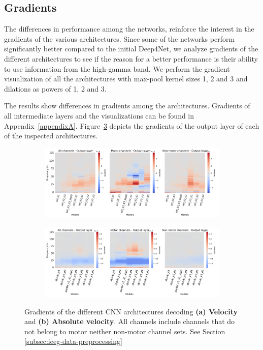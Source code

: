 \subsection{Gradients}\label{subsec:gradients}
The differences in performance among the networks, reinforce the interest in the gradients of the various architectures.
Since some of the networks perform significantly better compared to the initial Deep4Net, we analyze gradients of the different architectures to see if the reason for a better performance is their ability to use information from the high-gamma band.
We perform the gradient visualization of all the architectures with max-pool kernel sizes 1, 2 and 3 and dilations as powers of 1, 2 and 3.

The results show differences in gradients among the architectures.
Gradients of all intermediate layers and the visualizations can be found in Appendix~\ref{appendixA}.
Figure~\ref{fig:last-layer-grads} depicts the gradients of the output layer of each of the inspected architectures.

\begin{figure}[!htpb]
\centering
\begin{subfigure}[b]{\textwidth}
   \includegraphics[width=1\linewidth]{img/ch4/vel-last-layer-grads}
   \caption{}
   \label{fig:absVel-last-layer-grads}
\end{subfigure}

\begin{subfigure}[b]{\textwidth}
   \includegraphics[width=1\linewidth]{img/ch4/absVel-last-layer-grads}
   \caption{}
   \label{fig:vel-last-layer-grads}
\end{subfigure}
\caption[Non-shifted causal prediction - gradients]{Gradients of the different CNN architectures decoding \textbf{(a) Velocity} and \textbf{(b) Absolute velocity}. All channels include channels that do not belong to motor neither non-motor channel sets. See Section \ref{subsec:ieeg-data-preprocessing}}
\label{fig:last-layer-grads}
\end{figure}

